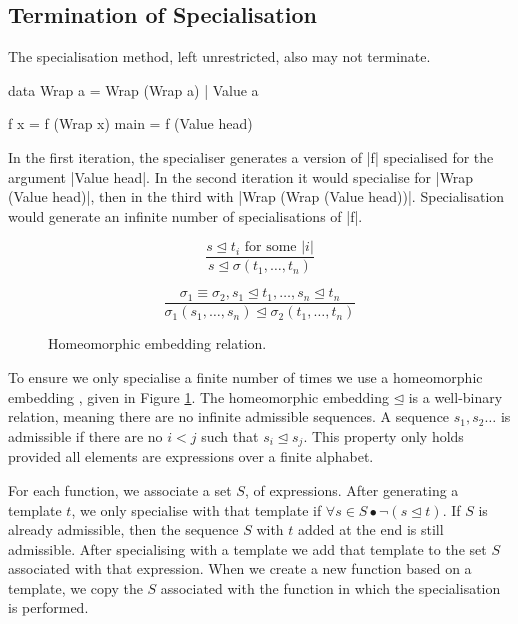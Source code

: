 \documentclass[preprint]{sigplanconf}
\begin{document}
\subsection{Termination of Specialisation}
\label{sec:termination_specialisation}

The specialisation method, left unrestricted, also may not terminate.

\begin{example}
\label{ex:wrap}
\begin{code}
data Wrap a  =  Wrap (Wrap a)
             |  Value a

f x = f (Wrap x)
main = f (Value head)
\end{code}

In the first iteration, the specialiser generates a version of |f| specialised for the argument |Value head|. In the second iteration it would specialise for |Wrap (Value head)|, then in the third with |Wrap (Wrap (Value head))|. Specialisation would generate an infinite number of specialisations of |f|.
\end{example}

\begin{figure}
\[\frac{s \unlhd t_i \text{ for some } |i|}{s \unlhd \sigma(t_1,\ldots,t_n)} \]

\[\frac{\sigma_1 \equiv \sigma_2,
        s_1 \unlhd t_1, \ldots , s_n \unlhd t_n}
       {\sigma_1 (s_1,\ldots,s_n) \unlhd \sigma_2 (t_1,\ldots,t_n)} \]

\caption{Homeomorphic embedding relation.}
\label{fig:homeomorphic}
\end{figure}

To ensure we only specialise a finite number of times we use a homeomorphic embedding \cite{leuschel:homeomorphic}, given in Figure \ref{fig:homeomorphic}. The homeomorphic embedding $\unlhd$ is a well-binary relation, meaning there are no infinite admissible sequences. A sequence $s_1,s_2 \ldots$ is admissible if there are no $i < j$ such that $s_i \unlhd s_j$. This property only holds provided all elements are expressions over a finite alphabet.

For each function, we associate a set $S$, of expressions. After generating a template $t$, we only specialise with that template if $\forall s \in S \bullet \neg(s \unlhd t)$. If $S$ is already admissible, then the sequence $S$ with $t$ added at the end is still admissible. After specialising with a template we add that template to the set $S$ associated with that expression. When we create a new function based on a template, we copy the $S$ associated with the function in which the specialisation is performed.
\end{document}
